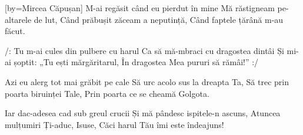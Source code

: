 [by={Mircea Căpușan}]
\beginverse
M-ai regăsit când eu pierdut în mine
Mă răstigneam pe-altarele de lut,
Când prăbușit zăceam a neputință,
Când faptele țărână m-au făcut.
\endverse

\beginchorus
/: Tu m-ai cules din pulbere cu harul
Ca să mă-mbraci cu dragostea dintâi
Și mi-ai șoptit: „Tu ești mărgăritarul,
În dragostea Mea pururi să rămâi!” :/
\endchorus

\beginverse
Azi eu alerg tot mai grăbit pe cale
Să urc acolo sus la dreapta Ta,
Să trec prin poarta biruinței Tale,
Prin poarta ce se cheamă Golgota.
\endverse

\beginverse
Iar dac-adesea cad sub greul crucii
Și mă pândesc ispitele-n ascuns,
Atuncea mulțumiri Ți-aduc, Isuse,
Căci harul Tău îmi este îndeajuns!
\endverse
\endsong